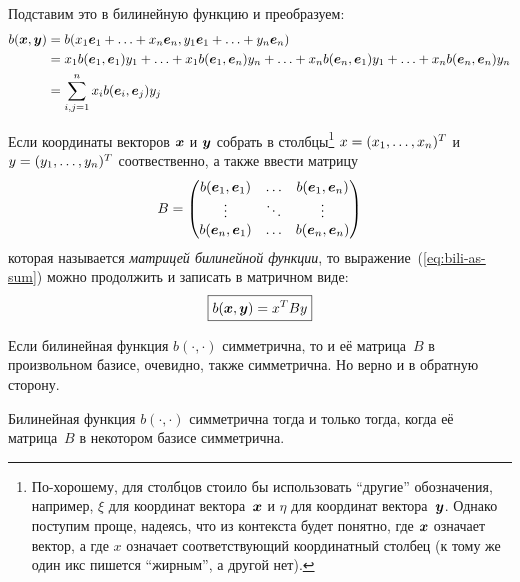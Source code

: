 \documentclass[a4paper,12pt]{article}
\begin{document}
  Подставим это в билинейную функцию и преобразуем:
  \begin{equation}\label{eq:bili-as-sum}
  \begin{split}
    b(\boldsymbol x, \boldsymbol y)
    &= b(x_1 \boldsymbol e_1 + \ldots + x_n \boldsymbol e_n, y_1 \boldsymbol e_1 + \ldots + y_n \boldsymbol e_n)\\
    &= x_1 b(\boldsymbol e_1, \boldsymbol e_1) y_1 + \ldots + x_1 b(\boldsymbol e_1, \boldsymbol e_n) y_n + \ldots + x_n b(\boldsymbol e_n, \boldsymbol e_1) y_1 + \ldots + x_n b(\boldsymbol e_n, \boldsymbol e_n) y_n\\
    &= \sum_{i, j = 1}^n x_i b(\boldsymbol e_i, \boldsymbol e_j) y_j
  \end{split}
  \end{equation}
  
  Если координаты векторов $\boldsymbol x$ и $\boldsymbol y$ собрать в столбцы\footnote{По-хорошему, для столбцов стоило бы использовать ``другие'' обозначения, например, $\xi$ для координат вектора~$\boldsymbol x$ и $\eta$ для координат вектора~$\boldsymbol y$. Однако поступим проще, надеясь, что из контекста будет понятно, где $\boldsymbol x$ означает вектор, а где $x$ означает соответствующий координатный столбец (к тому же один икс пишется ``жирным'', а другой нет).} $x \hm= (x_1, \ldots, x_n)^T$ и $y \hm= (y_1, \ldots, y_n)^T$ соотвественно, а также ввести матрицу
  \[
    B = \begin{pmatrix}
      b(\boldsymbol e_1, \boldsymbol e_1) & \ldots & b(\boldsymbol e_1, \boldsymbol e_n)\\
      \vdots                & \ddots & \vdots\\
      b(\boldsymbol e_n, \boldsymbol e_1) & \ldots & b(\boldsymbol e_n, \boldsymbol e_n)
    \end{pmatrix}
  \]
  которая называется \emph{матрицей билинейной функции}, то выражение~(\ref{eq:bili-as-sum}) можно продолжить и записать в матричном виде:
  \[
    \boxed{
      b(\boldsymbol x, \boldsymbol y) = x^T B y
    }
  \]
  
  Если билинейная функция $b(\cdot, \cdot)$ симметрична, то и её матрица~$B$ в произвольном базисе, очевидно, также симметрична.
  Но верно и в обратную сторону.
  
  \begin{proposition}
    Билинейная функция $b(\cdot, \cdot)$ симметрична тогда и только тогда, когда её матрица~$B$ в некотором базисе симметрична.
  \end{proposition}
  
\end{document}
